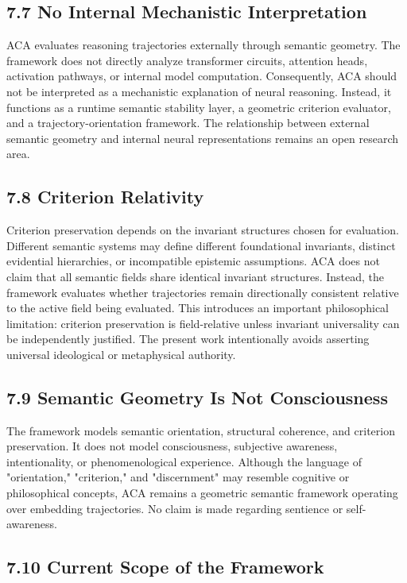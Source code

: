 \documentclass[11pt]{article}
\begin{document}
\subsection{7.7 No Internal Mechanistic Interpretation}

ACA evaluates reasoning trajectories externally through semantic geometry. The framework does not directly analyze transformer circuits, attention heads, activation pathways, or internal model computation. Consequently, ACA should not be interpreted as a mechanistic explanation of neural reasoning. Instead, it functions as a runtime semantic stability layer, a geometric criterion evaluator, and a trajectory-orientation framework. The relationship between external semantic geometry and internal neural representations remains an open research area.

\subsection{7.8 Criterion Relativity}

Criterion preservation depends on the invariant structures chosen for evaluation. Different semantic systems may define different foundational invariants, distinct evidential hierarchies, or incompatible epistemic assumptions. ACA does not claim that all semantic fields share identical invariant structures. Instead, the framework evaluates whether trajectories remain directionally consistent relative to the active field being evaluated. This introduces an important philosophical limitation: criterion preservation is field-relative unless invariant universality can be independently justified. The present work intentionally avoids asserting universal ideological or metaphysical authority.

\subsection{7.9 Semantic Geometry Is Not Consciousness}

The framework models semantic orientation, structural coherence, and criterion preservation. It does not model consciousness, subjective awareness, intentionality, or phenomenological experience. Although the language of "orientation," "criterion," and "discernment" may resemble cognitive or philosophical concepts, ACA remains a geometric semantic framework operating over embedding trajectories. No claim is made regarding sentience or self-awareness.

\subsection{7.10 Current Scope of the Framework}
\end{document}
